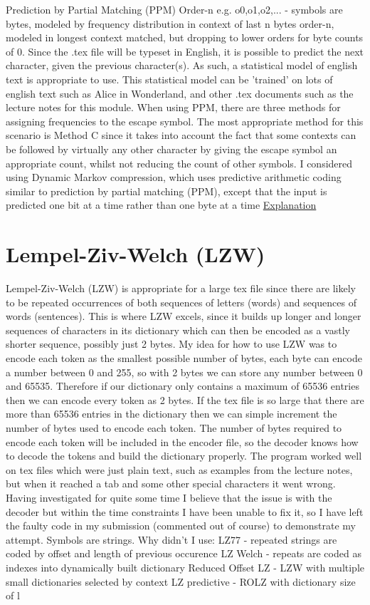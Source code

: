 \documentclass[a4paper, 11pt]{article}
\numberwithin{equation}{section}
\theoremstyle{plain}
\theoremstyle{definition}
\begin{document}
Prediction by Partial Matching (PPM)
Order-n e.g. o0,o1,o2,... - symbols are bytes, modeled by frequency distribution in context of last n bytes
order-n, modeled in longest context matched, but dropping to lower orders for byte counts of 0.
Since the .tex file will be typeset in English, it is possible to predict the next character, 
given the previous character(s). As such, a statistical model of english text is appropriate to use. 
This statistical model can be 'trained' on lots of english text such as Alice in Wonderland, 
and other .tex documents such as the lecture notes for this module. 
When using PPM, there are three methods for assigning frequencies to the escape symbol. 
The most appropriate method for this scenario is Method C since it takes into account the fact that 
some contexts can be followed by virtually any other character by giving the escape symbol 
an appropriate count, whilst not reducing the count of other symbols.
I considered using Dynamic Markov compression, which uses predictive arithmetic coding similar to prediction by partial matching (PPM), 
except that the input is predicted one bit at a time rather than one byte at a time
\href{https://mattmahoney.net/dc/dce.html#Section_422}{Explanation}

\section{Lempel-Ziv-Welch (LZW)}

Lempel-Ziv-Welch (LZW) is appropriate for a large tex file since there are likely to be repeated occurrences 
of both sequences of letters (words) and sequences of words (sentences). 
This is where LZW excels, since it builds up longer and longer sequences of characters in its dictionary 
which can then be encoded as a vastly shorter sequence, possibly just 2 bytes. 
My idea for how to use LZW was to encode each token as the smallest possible number of bytes, 
each byte can encode a number between 0 and 255, so with 2 bytes we can store any number between 
0 and 65535. 
Therefore if our dictionary only contains a maximum of 65536 entries then we can encode every token as 
2 bytes. 
If the tex file is so large that there are more than 65536 entries in the dictionary then we can simple 
increment the number of bytes used to encode each token. 
The number of bytes required to encode each token will be included in the encoder file, so the decoder 
knows how to decode the tokens and build the dictionary properly. 
The program worked well on tex files which were just plain text, such as examples from the lecture notes, 
but when it reached a tab and some other special characters it went wrong. 
Having investigated for quite some time I believe that the issue is with the decoder but within the 
time constraints I have been unable to fix it, so I have left the faulty code in my submission 
(commented out of course) to demonstrate my attempt. 
Symbols are strings.
Why didn't I use:
LZ77 - repeated strings are coded by offset and length of previous occurence
LZ Welch - repeats are coded as indexes into dynamically built dictionary
Reduced Offset LZ - LZW with multiple small dictionaries selected by context
LZ predictive - ROLZ with dictionary size of l
\end{document}
